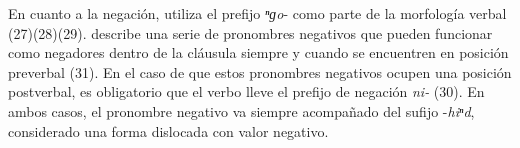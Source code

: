En cuanto a la negación, utiliza el prefijo {\setmainfont{Charis SIL} \textit{ⁿɡo}-} como parte de la morfología verbal (27)(28)(29). \textcolor{MidnightBlue}{\citet{Huave}} describe una serie de pronombres negativos que pueden funcionar como negadores dentro de la cláusula siempre y cuando se encuentren en posición preverbal (31). En el caso de que estos pronombres negativos ocupen una posición postverbal, es obligatorio que el verbo lleve el prefijo de negación {\setmainfont{Charis SIL} \textit{ni-}} (30). En ambos casos, el pronombre negativo va siempre acompañado del sufijo {\setmainfont{Charis SIL} -\textit{hiⁿd}}, considerado una forma dislocada con valor negativo.